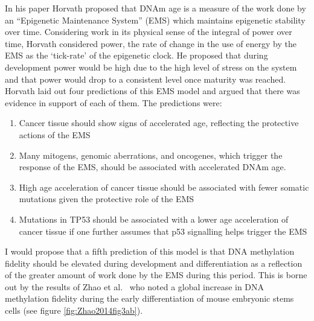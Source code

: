 \documentclass[
]{book}
\providecommand{\tightlist}{%
  \setlength{\itemsep}{0pt}\setlength{\parskip}{0pt}}
\begin{document}
In his paper \citep{Horvath2013} Horvath proposed that DNAm age is a measure of the work done by an ``Epigenetic Maintenance System'' (EMS) which maintains epigenetic stability over time. Considering work in its physical sense of the integral of power over time, Horvath considered power, the rate of change in the use of energy by the EMS as the `tick-rate' of the epigenetic clock. He proposed that during development power would be high due to the high level of stress on the system and that power would drop to a consistent level once maturity was reached. Horvath laid out four predictions of this EMS model and argued that there was evidence in support of each of them. The predictions were:

\begin{enumerate}
\def\labelenumi{\arabic{enumi}.}
\tightlist
\item
  Cancer tissue should show signs of accelerated age, reflecting the protective actions of the EMS
\item
  Many mitogens, genomic aberrations, and oncogenes, which trigger the response of the EMS, should be associated with accelerated DNAm age.
\item
  High age acceleration of cancer tissue should be associated with fewer somatic mutations given the protective role of the EMS
\item
  Mutations in TP53 should be associated with a lower age acceleration of cancer tissue if one further assumes that p53 signalling helps trigger the EMS
\end{enumerate}

I would propose that a fifth prediction of this model is that DNA methylation fidelity should be elevated during development and differentiation as a reflection of the greater amount of work done by the EMS during this period. This is borne out by the results of Zhao et al.~\citep{Zhao2014} who noted a global increase in DNA methylation fidelity during the early differentiation of mouse embryonic stems cells (see figure \ref{fig:Zhao2014fig3ab}).
\end{document}

